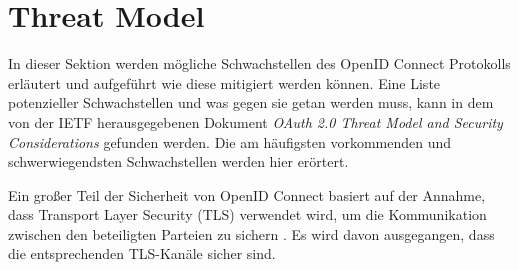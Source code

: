 


\section{Threat Model}

In dieser Sektion werden mögliche Schwachstellen des OpenID Connect Protokolls erläutert und aufgeführt wie diese mitigiert werden können. Eine Liste potenzieller Schwachstellen und was gegen sie getan werden muss, kann in dem von der IETF herausgegebenen Dokument \textit{OAuth 2.0 Threat Model and Security Considerations} \cite{RFC6819} gefunden werden. Die am häufigsten vorkommenden und schwerwiegendsten Schwachstellen werden hier erörtert. \cite{ssoProtocols}

Ein großer Teil der Sicherheit von OpenID Connect basiert auf der Annahme, dass Transport Layer Security (TLS) verwendet wird, um die Kommunikation zwischen den beteiligten Parteien zu sichern \cite{mladenov2016security}. Es wird davon ausgegangen, dass die entsprechenden TLS-Kanäle sicher sind. 

